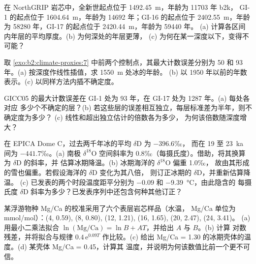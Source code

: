\begin{exercise}[$\star\star$]\label{exo:b2:climate-proxies:7}
在 NorthGRIP 岩芯中，全新世起点位于 \qty{1492.45}{m}，年龄为 \num{11703} 年 b2k，
GI-1 的起点位于 \qty{1604.64}{m}，年龄为 \num{14692} 年；GI-16 的起点位于
\qty{2402.55}{m}，年龄为 \num{58280} 年，GI-17 的起点位于 \qty{2420.44}{m}，年龄为 \num{59440} 年。
(a) 计算各区间内年层的平均厚度。(b) 为何深处的年层更薄，
(c) 为何在某一深度以下，变得不可能？
\end{exercise}

\begin{exercise}[$\star\star$]\label{exo:b2:climate-proxies:8}
取 \cref{exo:b2:climate-proxies:7} 中前两个控制点，其最大计数误差分别为 50
和 93 年。(a) 按深度作线性插值，求 \qty{1550}{m} 处冰的年龄。
(b) 以 1950 年以前的年数表示。(c) 以同样方法内插不确定度。
\end{exercise}

\begin{exercise}[$\star\star$]\label{exo:b2:climate-proxies:9}
GICC05 的最大计数误差在 GI-1 处为 93 年，在 GI-17 处为 \num{1287} 年。(a) 每处各对应
多少个不确定的层？(b) 若这些层的误差相互独立，每层标准差为半年，则不确定度为多少？
(c) 线性和超出独立估计的倍数各为多少，
为何该倍数随深度增大？
\end{exercise}

\begin{exercise}[$\star\star\star$]\label{exo:b2:climate-proxies:10}
在 EPICA Dome C，过去两千年冰的平均 $\delta$D 为 $-396.6$‰，
而在 19 至 \qty{23}{ka} 间为 $-441.7$‰。(a) 南极 $\delta^{18}$O 空间斜率为
\num{0.8}‰（每摄氏度）。借助，将其换算为 $\delta$D 的斜率，并
估算冰期降温。(b) 冰期海洋的 $\delta^{18}$O 偏重 \num{1.0}‰，
故由其形成的雪也偏重。若假设海洋的 $\delta$D 变化为其八倍，
则订正冰期的 $\delta$D，并重新估算降温。
(c) 已发表的两个时段温度距平分别为 $-0.09$ 和 \qty{-9.39}{\celsius}，由此隐含的
每摄氏度 $\delta$D 斜率为多少？已发表序列中还包含何种其他订正？
\end{exercise}

\begin{exercise}[$\star\star\star$]\label{exo:b2:climate-proxies:11}
某浮游物种 Mg/Ca 的校准采用了六个表层岩芯样品（水温，
Mg/Ca 单位为 \unit{mmol/mol}）：(4, 0.59), (8, 0.80), (12, 1.21), (16, 1.65), (20, 2.47), (24, 3.41)。
(a) 用最小二乘法拟合 $\ln(\text{Mg/Ca}) = \ln B + AT$，并给出 $A$ 与 $B$。(b) 计算
对数残差，并将拟合与规律 $0.4\,\mathrm{e}^{0.09T}$ 作比较。(c) 给出
Mg/Ca = 1.30 的冰期壳体的温度。(d) 某壳体 Mg/Ca = 0.45，计算其
温度，并说明为何该数值比前一个更不可信。
\end{exercise}

